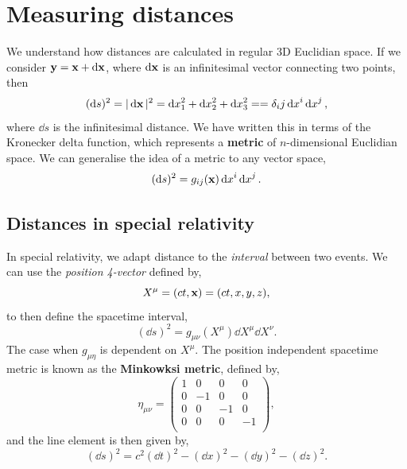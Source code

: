 \documentclass{book}
\begin{document}
\section{Measuring distances}
We understand how distances are calculated in regular 3D Euclidian space. If we consider $\vb{y} = \vb{x} + \dd{\vb{x}}$, where $\dd{\vb{x}}$ is an infinitesimal vector connecting two points, then
\begin{equation}
	(\dd{s})^2 = |\dd{\vb{x}}|^2 = \dd{x}_1^2 + \dd{x}_2^2 + \dd{x}_3^2 = =\delta_ij \dd{x}^i\dd{x}^j,
\end{equation}
where $\dd{s}$ is the infinitesimal distance. We have written this in terms of the Kronecker delta function, which represents a \textbf{metric} of $n$-dimensional Euclidian space. We can generalise the idea of a metric to any vector space,
\begin{equation}
	(\dd{s})^2 = g_{ij}(\vb{x})\dd{x}^i\dd{x}^j.
\end{equation}
\subsection{Distances in special relativity}
In special relativity, we adapt distance to the \textit{interval} between two events. We can use the \textit{position 4-vector} defined by,
\begin{equation}
	X^{\mu} = (ct, \vb{x}) = (ct, x,y,z),
\end{equation}
to then define the spacetime interval,
\begin{equation}
	(\dd{s})^2 = g_{\mu \nu}(X^{\mu})\dd{X}^{\mu}\dd{X}^{\nu}.
\end{equation}
The case when $g_{\mu \eta}$ is dependent on $X^{\mu}$. The position independent spacetime metric is known as the \textbf{Minkowksi metric}, defined by,
\begin{equation}
	\eta_{\mu\nu} = \begin{pmatrix}
		1 & 0 & 0 & 0\\
		0 & -1 & 0 & 0\\
		0 & 0 & -1 & 0\\
		0 & 0 & 0 & -1 \\
	\end{pmatrix},
\end{equation}
and the line element is then given by,
\begin{equation}
	(\dd{s})^2 = c^2(\dd{t})^2 - (\dd{x})^2 - (\dd{y})^2 - (\dd{z})^2.
\end{equation}
\end{document}
